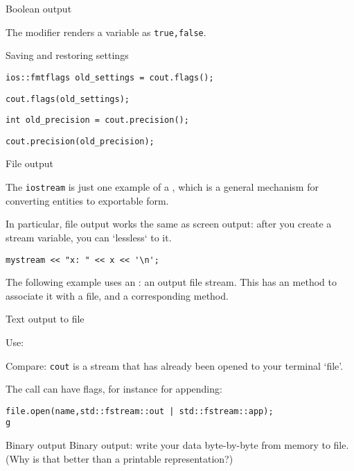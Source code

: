  {Boolean output}
\label{sec:boolalpha}

The  modifier renders a  variable
as \lstinline{true,false}.

 {Saving and restoring settings}

\begin{verbatim}
ios::fmtflags old_settings = cout.flags();
\end{verbatim}

\begin{verbatim}
cout.flags(old_settings);
\end{verbatim}

\begin{verbatim}
int old_precision = cout.precision();
\end{verbatim}

\begin{verbatim}
cout.precision(old_precision);
\end{verbatim}

 {File output}

The \lstinline{iostream} is just one example of a ,
which is a general mechanism for converting entities to exportable form.

In particular, file output works the same as screen output:
after you create a stream variable, you can `lessless` to it.
\begin{lstlisting}
mystream << "x: " << x << '\n';
\end{lstlisting}

The following example uses an :
an output file stream.
This has an  method
to associate it with a file, and a corresponding  method.

\begin{block}{Text output to file}
  \label{sl:io-file}

  Use:
  \def\snippetcodefraction{.5}
  \def\snippetanswfraction{.5}

  Compare: \lstinline{cout} is a stream that has already been opened
  to your terminal `file'.
\end{block}

The  call can have flags, for instance for appending:
\begin{lstlisting}
file.open(name,std::fstream::out | std::fstream::app);
g\end{lstlisting}

\begin{block}{Binary output}
  \label{sl:io-bin}
  Binary output: write your data byte-by-byte from memory to file.\\
  (Why is that better than a printable representation?)
  
\end{block}

